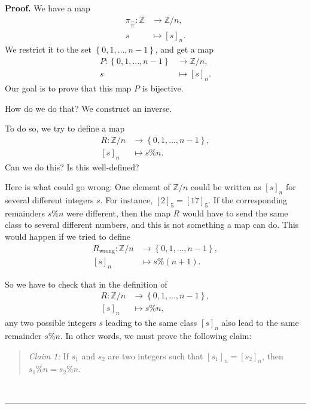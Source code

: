\documentclass[numbers=enddot,12pt,final,onecolumn,notitlepage]{scrartcl}%
\numberwithin{exer}{subsection}
\theoremstyle{definition}
\newenvironment{statement}{\begin{quote}}{\end{quote}}
\newenvironment{proof}[1][Proof]{\noindent\textbf{#1.} }{\ \rule{0.5em}{0.5em}}
\begin{document}
\begin{proof}
We have a map%
\begin{align*}
\pi_{\underset{n}{\equiv}}:\mathbb{Z}  & \rightarrow\mathbb{Z}/n,\\
s  & \mapsto\left[  s\right]  _{n}.
\end{align*}
We restrict it to the set $\left\{  0,1,\ldots,n-1\right\}  $, and get a map%
\begin{align*}
P:\left\{  0,1,\ldots,n-1\right\}    & \rightarrow\mathbb{Z}/n,\\
s  & \mapsto\left[  s\right]  _{n}.
\end{align*}
Our goal is to prove that this map $P$ is bijective.

How do we do that? We construct an inverse.

To do so, we try to define a map%
\begin{align*}
R:\mathbb{Z}/n  & \rightarrow\left\{  0,1,\ldots,n-1\right\}  ,\\
\left[  s\right]  _{n}  & \mapsto s\%n.
\end{align*}
Can we do this? Is this well-defined?

Here is what could go wrong: One element of $\mathbb{Z}/n$ could be written as
$\left[  s\right]  _{n}$ for several different integers $s$. For instance,
$\left[  2\right]  _{5}=\left[  17\right]  _{5}$. If the corresponding
remainders $s\%n$ were different, then the map $R$ would have to send the same
class to several different numbers, and this is not something a map can do.
This would happen if we tried to define%
\begin{align*}
R_{\operatorname*{wrong}}:\mathbb{Z}/n  & \rightarrow\left\{  0,1,\ldots
,n-1\right\}  ,\\
\left[  s\right]  _{n}  & \mapsto s\%\left(  n+1\right)  .
\end{align*}


So we have to check that in the definition of
\begin{align*}
R:\mathbb{Z}/n  & \rightarrow\left\{  0,1,\ldots,n-1\right\}  ,\\
\left[  s\right]  _{n}  & \mapsto s\%n,
\end{align*}
any two possible integers $s$ leading to the same class $\left[  s\right]
_{n}$ also lead to the same remainder $s\%n$. In other words, we must prove
the following claim:

\begin{statement}
\textit{Claim 1:} If $s_{1}$ and $s_{2}$ are two integers such that $\left[
s_{1}\right]  _{n}=\left[  s_{2}\right]  _{n}$, then $s_{1}\%n=s_{2}\%n$.
\end{statement}


\end{proof}
\end{document}
